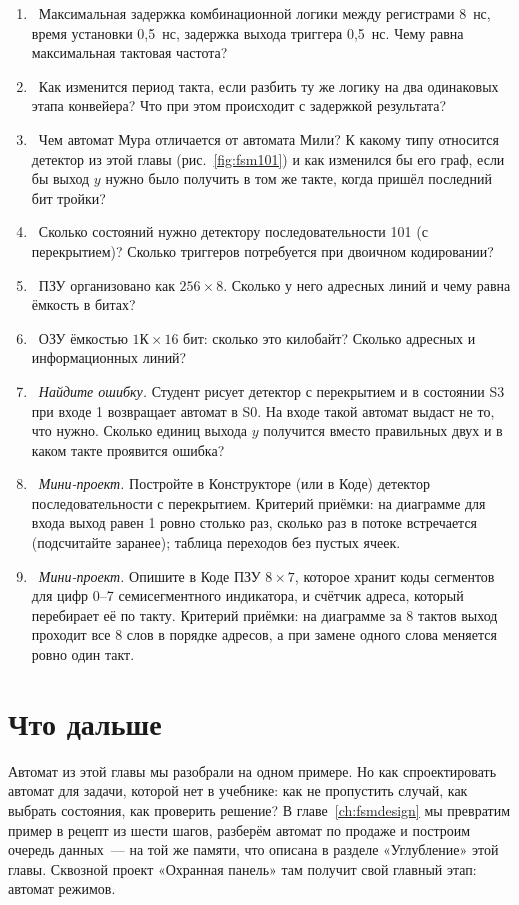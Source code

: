\begin{taskbox}
\begin{enumerate}
  \item {}~Максимальная задержка комбинационной логики между регистрами 8~нс, время установки 0,5~нс, задержка выхода триггера 0,5~нс. Чему равна максимальная тактовая частота?
  \item {}~Как изменится период такта, если разбить ту же логику на два одинаковых этапа конвейера? Что при этом происходит с задержкой результата?
  \item {}~Чем автомат Мура отличается от автомата Мили? К какому типу относится детектор  из этой главы (рис.~\ref{fig:fsm101}) и как изменился бы его граф, если бы выход $y$ нужно было получить в том же такте, когда пришёл последний бит тройки?
  \item {}~Сколько состояний нужно детектору последовательности 101 (с перекрытием)? Сколько триггеров потребуется при двоичном кодировании?
  \item {}~ПЗУ организовано как $256\times 8$. Сколько у него адресных линий и чему равна ёмкость в битах?
  \item {}~ОЗУ ёмкостью $1\text{К}\times 16$ бит: сколько это килобайт? Сколько адресных и информационных линий?
  \item {}~\emph{Найдите ошибку.} Студент рисует детектор  с перекрытием и в состоянии S3 при входе 1 возвращает автомат в S0. На входе  такой автомат выдаст не то, что нужно. Сколько единиц выхода $y$ получится вместо правильных двух и в каком такте проявится ошибка?
  \item {}~\emph{Мини-проект.} Постройте в Конструкторе (или в Коде) детектор последовательности  с перекрытием. Критерий приёмки: на диаграмме для входа  выход равен 1 ровно столько раз, сколько раз в потоке встречается  (подсчитайте заранее); таблица переходов без пустых ячеек.
  \item {}~\emph{Мини-проект.} Опишите в Коде ПЗУ $8\times 7$, которое хранит коды сегментов для цифр 0--7 семисегментного индикатора, и счётчик адреса, который перебирает её по такту. Критерий приёмки: на диаграмме за 8 тактов выход проходит все 8 слов в порядке адресов, а при замене одного слова меняется ровно один такт.
\end{enumerate}
\end{taskbox}

\section{Что дальше}

Автомат из этой главы мы разобрали на одном примере. Но как спроектировать
автомат для задачи, которой нет в учебнике: как не пропустить случай, как
выбрать состояния, как проверить решение? В главе~\ref{ch:fsmdesign} мы
превратим пример в рецепт из шести шагов, разберём автомат по продаже и
построим очередь данных~--- на той же памяти, что описана в разделе
«Углубление» этой главы. Сквозной проект «Охранная панель» там получит свой
главный этап: автомат режимов.
